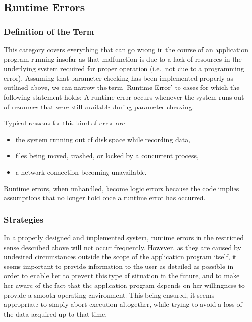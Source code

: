 \documentclass[12pt,a4paper]{article}
\begin{document}
\subsection{Runtime Errors}

\subsubsection{Definition of the Term}

This category covers everything that can go wrong
in the course of an application program running
insofar as that malfunction is due to a lack of resources in the
underlying system required for proper operation
(i.e., not due to a programming error).
Assuming that parameter checking has been implemented
properly as outlined above, we can narrow the term
`Runtime Error' to cases for which the following statement
holds: A runtime error occurs whenever the system runs
out of resources that were still available during parameter
checking.

Typical reasons for this kind of error are
\begin{itemize}
\item the system running out of disk space while recording data,
\item files being moved, trashed, or locked by a concurrent process,
\item a network connection becoming unavailable.
\end{itemize}

Runtime errors, when unhandled, become logic errors because
the code implies assumptions that no longer hold once a
runtime error has occurred.

\subsubsection{Strategies}

In a properly designed and implemented system, runtime errors
in the restricted sense described above will not occur 
frequently. However, as they are caused by undesired
circumstances outside the scope of the application program
itself, it seems important to provide information
to the user as detailed as possible in order to enable her
to prevent this type of situation in the future, and to 
make her aware of the fact that the application program
depends on her willingness to provide a smooth operating
environment. This being ensured, it seems appropriate to
simply abort execution altogether, while trying to avoid 
a loss of the data acquired up to that time.
\end{document}
